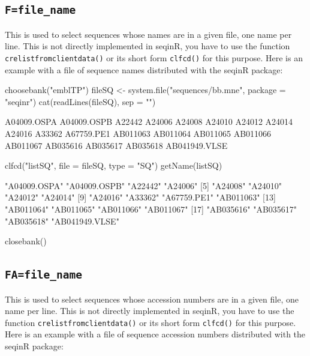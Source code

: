 \documentclass{article}
\begin{document}
\subsection{\texttt{F=file\_name}}

This is used to select sequences whose names are in a given file, one name per line.
This is not directly implemented in seqinR, you have to use the function
\texttt{crelistfromclientdata()} or its short form \texttt{clfcd()} for this purpose. Here is an example with
a file of sequence names distributed with the seqinR package:

\begin{Schunk}
\begin{Sinput}
 choosebank("emblTP")
 fileSQ <- system.file("sequences/bb.mne", package = "seqinr")
 cat(readLines(fileSQ), sep = "\n")
\end{Sinput}
\begin{Soutput}
A04009.OSPA
A04009.OSPB
A22442
A24006
A24008
A24010
A24012
A24014
A24016
A33362
A67759.PE1
AB011063
AB011064
AB011065
AB011066
AB011067
AB035616
AB035617
AB035618
AB041949.VLSE
\end{Soutput}
\begin{Sinput}
 clfcd("listSQ", file = fileSQ, type = "SQ")
 getName(listSQ)
\end{Sinput}
\begin{Soutput}
 [1] "A04009.OSPA"   "A04009.OSPB"   "A22442"        "A24006"       
 [5] "A24008"        "A24010"        "A24012"        "A24014"       
 [9] "A24016"        "A33362"        "A67759.PE1"    "AB011063"     
[13] "AB011064"      "AB011065"      "AB011066"      "AB011067"     
[17] "AB035616"      "AB035617"      "AB035618"      "AB041949.VLSE"
\end{Soutput}
\begin{Sinput}
 closebank()
\end{Sinput}
\end{Schunk}


\subsection{\texttt{FA=file\_name}}

This is used to select sequences whose accession numbers are in a given file, one name per line.
This is not directly implemented in seqinR, you have to use the function
\texttt{crelistfromclientdata()} or its short form \texttt{clfcd()} for this purpose. Here is an example with
a file of sequence accession numbers distributed with the seqinR package:
\end{document}
